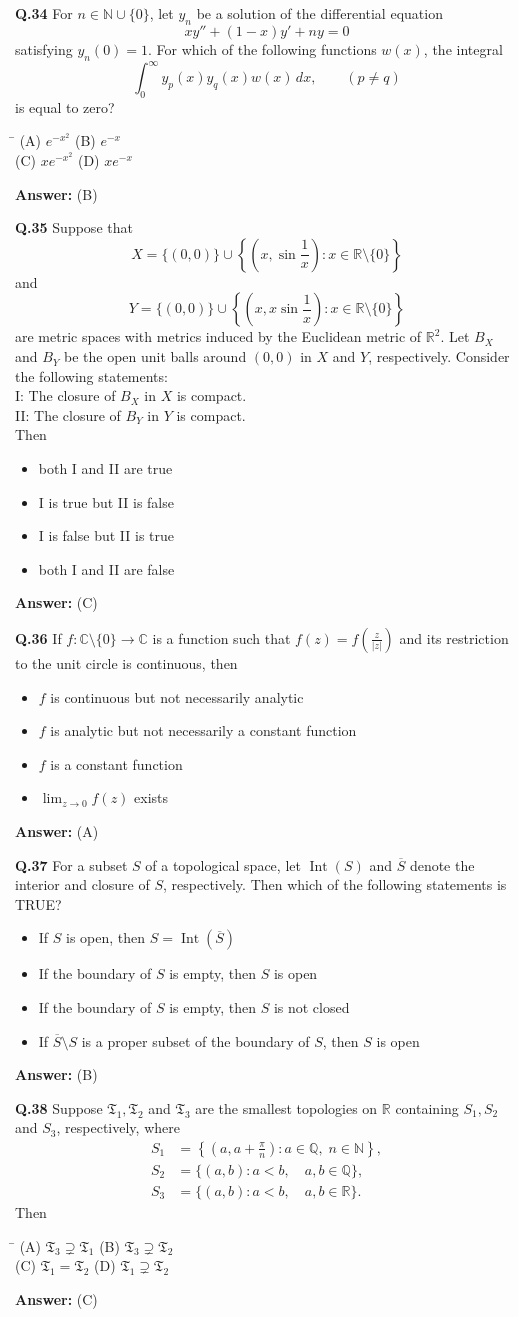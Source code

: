 \documentclass[11pt,a4paper]{article}
\newcommand{\optsfourA}[4]{%
  \begin{tabbing}
    \hspace{0.48\linewidth}\=\kill
    (A) #1 \> (B) #2 \\[2pt]
    (C) #3 \> (D) #4
  \end{tabbing}%
}
\newcommand{\optslistA}[4]{%
  \begin{itemize}
    \setlength{\itemsep}{2pt}\setlength{\parskip}{0pt}
    \item[(A)] #1
    \item[(B)] #2
    \item[(C)] #3
    \item[(D)] #4
  \end{itemize}%
}
\newcommand{\ans}[1]{\textbf{Answer:} #1\par\medskip}
\begin{document}
\textbf{Q.34} For $n \in \mathbb{N} \cup \{0\}$, let $y_n$ be a solution of the differential equation
\[
  x y'' + (1 - x) y' + n y = 0
\]
satisfying $y_n(0) = 1$. For which of the following functions $w(x)$, the integral
\[
  \int_0^\infty y_p(x) y_q(x) w(x)\,dx, \qquad (p \neq q)
\]
is equal to zero?
\optsfourA{$e^{-x^2}$}{$e^{-x}$}{$x e^{-x^2}$}{$x e^{-x}$}
\ans{(B)}

\textbf{Q.35} Suppose that
\[
  X = \{(0, 0)\} \cup \left\{\left(x, \sin\frac{1}{x}\right) : x \in \mathbb{R} \setminus \{0\}\right\}
\]
and
\[
  Y = \{(0, 0)\} \cup \left\{\left(x, x\sin\frac{1}{x}\right) : x \in \mathbb{R} \setminus \{0\}\right\}
\]
are metric spaces with metrics induced by the Euclidean metric of $\mathbb{R}^2$. Let $B_X$ and $B_Y$ be the open unit balls around $(0, 0)$ in $X$ and $Y$, respectively. Consider the following statements:\\
I: The closure of $B_X$ in $X$ is compact.\\
II: The closure of $B_Y$ in $Y$ is compact.\\
Then
\optslistA{both I and II are true}{I is true but II is false}{I is false but II is true}{both I and II are false}
\ans{(C)}

\textbf{Q.36} If $f : \mathbb{C} \setminus \{0\} \to \mathbb{C}$ is a function such that $f(z) = f\!\left(\frac{z}{|z|}\right)$ and its restriction to the unit circle is continuous, then
\optslistA{$f$ is continuous but not necessarily analytic}{$f$ is analytic but not necessarily a constant function}{$f$ is a constant function}{$\lim_{z\to 0} f(z)$ exists}
\ans{(A)}

\textbf{Q.37} For a subset $S$ of a topological space, let $\operatorname{Int}(S)$ and $\overline{S}$ denote the interior and closure of $S$, respectively. Then which of the following statements is TRUE?
\optslistA{If $S$ is open, then $S = \operatorname{Int}(\overline{S})$}{If the boundary of $S$ is empty, then $S$ is open}{If the boundary of $S$ is empty, then $S$ is not closed}{If $\overline{S} \setminus S$ is a proper subset of the boundary of $S$, then $S$ is open}
\ans{(B)}

\textbf{Q.38} Suppose $\mathfrak{T}_1, \mathfrak{T}_2$ and $\mathfrak{T}_3$ are the smallest topologies on $\mathbb{R}$ containing $S_1, S_2$ and $S_3$, respectively, where
\begin{align*}
  S_1 &= \left\{\left(a, a + \frac{\pi}{n}\right) : a \in \mathbb{Q},\; n \in \mathbb{N}\right\}, \\
  S_2 &= \{(a, b) : a < b,\quad a, b \in \mathbb{Q}\}, \\
  S_3 &= \{(a, b) : a < b,\quad a, b \in \mathbb{R}\}.
\end{align*}
Then
\optsfourA{$\mathfrak{T}_3 \supsetneq \mathfrak{T}_1$}{$\mathfrak{T}_3 \supsetneq \mathfrak{T}_2$}{$\mathfrak{T}_1 = \mathfrak{T}_2$}{$\mathfrak{T}_1 \supsetneq \mathfrak{T}_2$}
\ans{(C)}
\end{document}
